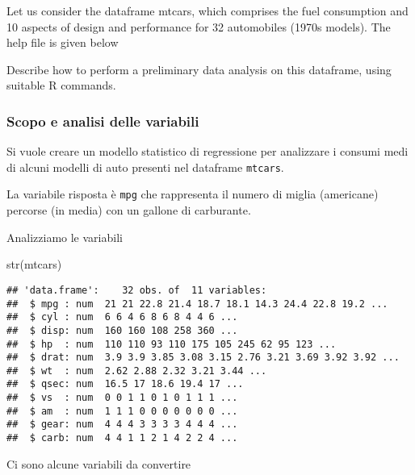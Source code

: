 \documentclass[
]{article}
\author{}
\date{\vspace{-2.5em}}
\newenvironment{Shaded}{\begin{snugshade}}{\end{snugshade}}
\newcommand{\FunctionTok}[1]{\textcolor[rgb]{0.00,0.00,0.00}{#1}}
\newcommand{\NormalTok}[1]{#1}
\begin{document}
Let us consider the dataframe mtcars, which comprises the fuel
consumption and 10 aspects of design and performance for 32 automobiles
(1970s models). The help file is given below

Describe how to perform a preliminary data analysis on this dataframe,
using suitable R commands.

\hypertarget{scopo-e-analisi-delle-variabili}{%
\subsubsection{Scopo e analisi delle
variabili}\label{scopo-e-analisi-delle-variabili}}

Si vuole creare un modello statistico di regressione per analizzare i
consumi medi di alcuni modelli di auto presenti nel dataframe
\texttt{mtcars}.

La variabile risposta è \texttt{mpg} che rappresenta il numero di miglia
(americane) percorse (in media) con un gallone di carburante.

Analizziamo le variabili

\begin{Shaded}
\begin{Highlighting}[]
\FunctionTok{str}\NormalTok{(mtcars)}
\end{Highlighting}
\end{Shaded}

\begin{verbatim}
## 'data.frame':    32 obs. of  11 variables:
##  $ mpg : num  21 21 22.8 21.4 18.7 18.1 14.3 24.4 22.8 19.2 ...
##  $ cyl : num  6 6 4 6 8 6 8 4 4 6 ...
##  $ disp: num  160 160 108 258 360 ...
##  $ hp  : num  110 110 93 110 175 105 245 62 95 123 ...
##  $ drat: num  3.9 3.9 3.85 3.08 3.15 2.76 3.21 3.69 3.92 3.92 ...
##  $ wt  : num  2.62 2.88 2.32 3.21 3.44 ...
##  $ qsec: num  16.5 17 18.6 19.4 17 ...
##  $ vs  : num  0 0 1 1 0 1 0 1 1 1 ...
##  $ am  : num  1 1 1 0 0 0 0 0 0 0 ...
##  $ gear: num  4 4 4 3 3 3 3 4 4 4 ...
##  $ carb: num  4 4 1 1 2 1 4 2 2 4 ...
\end{verbatim}

Ci sono alcune variabili da convertire
\end{document}
